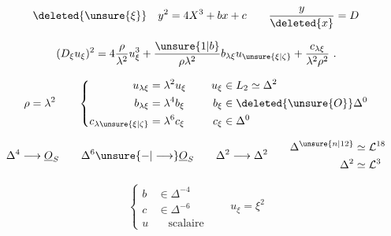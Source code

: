 \[
\deleted{\unsure{\xi}}\quad y^{2}=4X^3+bx+c\qquad
\frac{y}{\deleted{x}}=D
\]

\[
(D_{\xi}u_{\xi})^2=4\frac{\rho}{\lambda^2}u_{\xi}^3+
\frac{\unsure{1|b}}{\rho\lambda^2}b_{\lambda\xi}u_{\unsure{\xi|\zeta}}+
\frac{c_{\lambda\xi}}{\lambda^2\rho^2}\ .
\]

\[
\rho=\lambda^2\qquad
\left\{\begin{aligned}
u_{\lambda\xi}&=\lambda^2u_\xi\\
b_{\lambda\xi}&=\lambda^4 b_\xi\\
c_{\lambda\unsure{\xi|\zeta}}&=\lambda^6c_\xi
\end{aligned}\right.
\qquad
\begin{aligned}
u_\xi&\in L_2\simeq\Delta^2\\
b_\xi&\in\deleted{\unsure{O}}\Delta^0\\
c_\xi&\in\Delta^0
\end{aligned}
\]

\[
\Delta^4\longrightarrow\underline O_S\qquad
\Delta^6\unsure{\mathbin{-}|\longrightarrow}\underline O_S\qquad
\Delta^2\longrightarrow\Delta^2\qquad
\begin{aligned}
\Delta^{\unsure{n|12}}&\simeq\mathcal L^{18}\\
\Delta^2&\simeq\mathcal L^3
\end{aligned}
\]

\[
\left\{\begin{aligned}
b&\in\Delta^{-4}\\
c&\in\Delta^{-6}\\
u&\quad\text{scalaire}
\end{aligned}\right.
\qquad
u_\xi=\xi^2
\]

